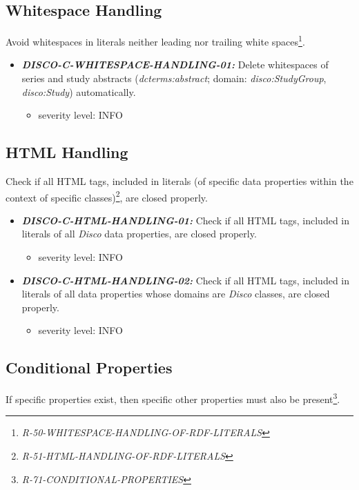 \documentclass{llncs}
\begin{document}
\subsection{Whitespace Handling}

Avoid whitespaces in literals neither leading nor trailing white spaces\footnote{\emph{R-50-WHITESPACE-HANDLING-OF-RDF-LITERALS}}.

\begin{itemize}
	\item \textbf{{\em DISCO-C-WHITESPACE-HANDLING-01:}} Delete whitespaces of series and study abstracts (\emph{dcterms:abstract}; domain: \emph{disco:StudyGroup}, \emph{disco:Study}) automatically.
	\begin{itemize}
		\item severity level: INFO
	\end{itemize}
\end{itemize}

\subsection{HTML Handling}

Check if all HTML tags, included in literals (of specific data properties within the context of specific classes)\footnote{\emph{R-51-HTML-HANDLING-OF-RDF-LITERALS}}, are closed properly.

\begin{itemize}
	\item \textbf{{\em DISCO-C-HTML-HANDLING-01:}} Check if all HTML tags, included in literals of all \emph{Disco} data properties, are closed properly.
		\begin{itemize}
		\item severity level: INFO
	\end{itemize}
	\item \textbf{{\em DISCO-C-HTML-HANDLING-02:}} Check if all HTML tags, included in literals of all data properties whose domains are \emph{Disco} classes, are closed properly.
		\begin{itemize}
		\item severity level: INFO
	\end{itemize}
\end{itemize}


\subsection{Conditional Properties}

If specific properties exist, then specific other properties must also be present\footnote{{\em R-71-CONDITIONAL-PROPERTIES}}.
\end{document}
